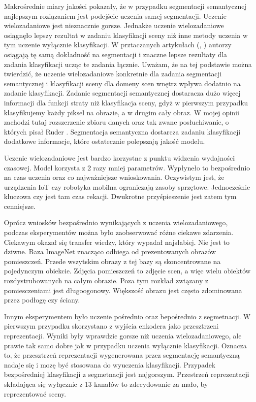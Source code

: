 Makrośrednie miary jakości pokazały, że w przypadku segmentacji semantycznej najlepszym roziązaniem jest podejście uczenia samej segmentacji. Uczenie wielozadaniowe jest nieznacznie gorsze. Jednakże uczenie wielozadaniowe osiągnęło lepszy rezultat w zadaniu klasyfikacji sceny niż inne metody uczenia w tym uczenie wyłącznie klasyfikacji. W prztaczanych artykułach (\cite{mehta2018net}, \cite{9892852}) autorzy osiągają tę samą dokładność na segmentacji i  znaczne lepsze rezultaty dla zadania klasyfikacji ucząc te zadania łącznie. Uważam, że na tej podstawie można twierdzić, że uczenie wielozadaniowe konkretnie dla zadania segmentacji semantycznej i klasyfikacji sceny dla domeny scen wnętrz wpływa dodatnio na zadanie klasyfikacji. Zadanie segmentacji semantycznej dostaracza dużo więcej informacji dla funkcji straty niż klasyfikacja sceny, gdyż w pierwszym przypadku klasyfikujemy każdy piksel na obrazie, a w drugim cały obraz. W mojej opinii zachodzi tutaj rozszerzenie zbioru danych oraz tak zwane posłuchiwanie, o których pisał Ruder \cite{ruder2017overview}. Segmentacja semantyczna dostarcza zadaniu klasyfikacji dodatkowe informacje, które ostatecznie polepszają jakość modelu.

Uczenie wielozadaniowe jest bardzo korzystne z punktu widzenia wydajności czasowej. Model korzysta z 2 razy mniej parametrów. Wypłyneło to bezpośrednio na czas uczenia oraz co najważniejsze wnioskowania. Oczywistym jest, że urządzenia IoT czy robotyka mobilna ograniczają zasoby sprzętowe. Jednocześnie kluczowa czy jest tam czas rekacji. Dwukrotne przyśpieszenie jest zatem tym cenniejsze.


Oprócz wniosków bezpośrednio wynikających z uczenia wielozadaniowego, podczas eksperymentów można było zaobserwować różne ciekawe zdarzenia. Ciekawym okazał się transfer wiedzy, który wypadał najsłabiej. Nie jest to dziwne. Baza ImageNet znacząco odbiega od prezentowanych obrazów pomieszczeń. Przede wszytskim obrazy z tej bazy są skoncentrowane na pojedynczym obiekcie. Zdjęcia pomieszczeń to zdjęcie scen, a więc wielu obiektów rozdystrubowanych na całym obrazie. Poza tym rozkład związany z pomiesczeniami jest długoogonowy. Większość obrazu jest często zdominowana przez podłogę czy ściany.

Innym eksperymentem było uczenie pośrednio oraz bepośrednio z segmetnacji. W pierwszym przypadku skorzystano z wyjścia enkodera jako przesztrzeni reprezentacji. Wyniki były wprawdzie gorsze niż uczenia wielozadaniowego, ale prawie tak samo dobre jak w przypadku uczenia wyłącznie klasyfikacji. Oznacza to, że przesztrzeń reprezentacji wygenerowana przez segmentację semantyczną nadaje się i mozę być stosowana do wyuczenia klasyfikacji. Przypadek bezpośredniej
klasyfikacji z segmetnacji jest najgorszym. Przestrzeń reprezentacji składająca się wyłącznie z 13 kanałów to zdecydowanie za mało, by reprezentować sceny.

